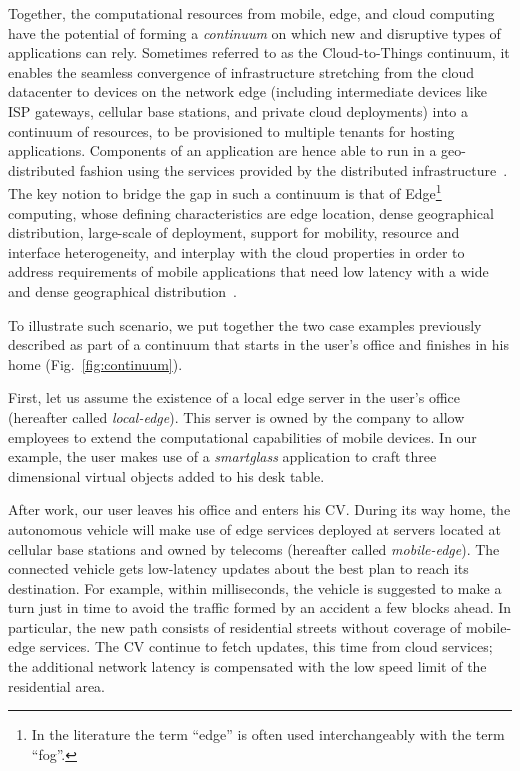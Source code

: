 Together, the computational resources from mobile, edge, and cloud computing have the potential of forming a \textit{continuum} on which new and disruptive types of applications can rely. Sometimes referred to as the Cloud-to-Things continuum, it enables the seamless convergence of infrastructure stretching from the cloud datacenter to devices on the network edge (including intermediate devices like ISP gateways, cellular base stations, and private cloud deployments) into a continuum of resources, to be provisioned to multiple tenants for hosting applications. Components of an application are hence able to run in a geo-distributed fashion using the services provided by the distributed infrastructure~\cite{GuptaIfogSim17}.   The key notion to bridge the gap in such a continuum is that of Edge\footnote{In the literature the term ``edge'' is often used interchangeably with the term ``fog''.} computing, whose defining characteristics are edge location, dense geographical distribution, large-scale of deployment, support for mobility, resource and interface heterogeneity, and interplay with the cloud properties in order to address requirements of mobile applications that need low latency with a wide and dense geographical distribution~\cite{Bonomi2014}.  

To illustrate such scenario, we put together the two case examples previously described as part of a continuum that starts in the user's office and finishes in his home (Fig.~\ref{fig:continuum}). 

First, let us assume the existence of a local edge server in the user's office (hereafter called \textit{local-edge}). This server is owned by the company to allow employees to extend the computational capabilities of mobile devices. In our example, the user makes use of a \textit{smartglass} application to craft three dimensional virtual objects added to his desk table.

After work, our user leaves his office and enters his CV. During its way home, the autonomous vehicle will make use of edge services deployed at servers located at cellular base stations and owned by telecoms (hereafter called \textit{mobile-edge}). The connected vehicle gets low-latency updates about the best plan to reach its destination. For example, within milliseconds, the vehicle is suggested to make a turn just in time to avoid the traffic formed by an accident a few blocks ahead. In particular, the new path consists of residential streets without coverage of mobile-edge services. The CV continue to fetch updates, this time from cloud services; the additional network latency is compensated with the low speed limit of the residential area.


